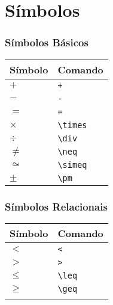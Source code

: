 \documentclass[brazilian]{beamer}
\begin{document}
\section{Símbolos}
\begin{frame}[fragile]
    \frametitle{Símbolos Básicos}

    \begin{table}
        \begin{tabular}{O{1.5cm}l}
            Símbolo & Comando \\ \hline
            \(+\) & \lstinline[style=myStyleLatex]!+! \\ \hline
            \(-\) & \lstinline[style=myStyleLatex]!-! \\ \hline
            \(=\) & \lstinline[style=myStyleLatex]!=! \\ \hline
            \(\times \) & \lstinline[style=myStyleLatex]!\times ! \\ \hline
            \(\div \) & \lstinline[style=myStyleLatex]!\div ! \\ \hline
            \(\neq \) & \lstinline[style=myStyleLatex]!\neq ! \\ \hline
            \(\simeq \) & \lstinline[style=myStyleLatex]!\simeq ! \\ \hline
            \(\pm \) & \lstinline[style=myStyleLatex]!\pm ! \\ \hline
        \end{tabular}
    \end{table}

\end{frame}

\begin{frame}[fragile]
    \frametitle{Símbolos Relacionais}

    \begin{table}
        \begin{tabular}{O{1.5cm}l}
            Símbolo & Comando \\ \hline
            \(<\) & \lstinline[style=myStyleLatex]!<! \\ \hline
            \(>\) & \lstinline[style=myStyleLatex]!>! \\ \hline
            \(\leq\) & \lstinline[style=myStyleLatex]!\leq! \\ \hline
            \(\geq \) & \lstinline[style=myStyleLatex]!\geq! \\ \hline
            \(\) & \lstinline[style=myStyleLatex]!! \\ \hline
        \end{tabular}
    \end{table}

\end{frame}
\end{document}
